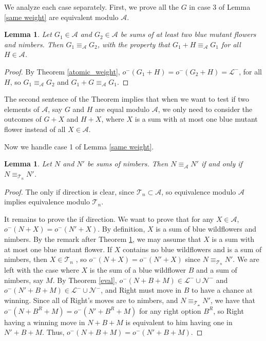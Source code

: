 \documentclass{amsart}
\theoremstyle{plain}
\newtheorem{lemma}[thm]{Lemma}
\theoremstyle{definition}
\theoremstyle{remark}
\numberwithin{equation}{section}
\numberwithin{thm}{section}
\begin{document}
 We analyze each case separately. First, we prove all the $G$ in case 3 of Lemma \ref{same weight}  are equivalent modulo $\mathscr{A}$.
\begin{lemma}
    \label{two_blue}
    Let $G_1\in \mathscr{A}$ and $G_2 \in \mathscr{A}$ be sums of at least two blue mutant flowers and nimbers. Then $G_1 \equiv_{\mathscr{A}} G_2$, with the property that $G_1 + H \equiv_{\mathscr{A}}  G_1$ for all $H \in \mathscr{A}$.
\end{lemma}
\begin{proof}
    By Theorem \ref{atomic_weight}, $o^-(G_1+H) = o^-(G_2+H) = \mathcal{L}^-$, for all $H$, so $G_1 \equiv_{\mathscr{A}} G_2$ and $G_1 + G \equiv_{\mathscr{A}} G_1$.
\end{proof}
The second sentence of the Theorem implies that when we want to test if two elements of $\mathscr{A}$, say $G$ and $H$ are equal modulo $\mathscr{A}$, we only need to consider the outcomes of $G+X$ and $H+X$, where $X$ is a sum with at most one blue mutant flower instead of all $X \in \mathscr{A}$.

Now we handle case 1 of Lemma \ref{same weight}.
\begin{lemma}
\label{1}
    Let $N$ and $N'$ be sums of nimbers. Then $N \equiv_{\mathscr{A}} N'$ if and only if  $N \equiv_{\mathscr{T}_n} N'$.
\end{lemma}
\begin{proof}
    The only if direction is clear, since $\mathscr{T}_n \subset \mathscr{A}$, so equivalence modulo $\mathscr{A}$ implies equivalence modulo $\mathscr{T}_n$.
    
  It remains to prove the if direction. We want to prove that for any $X \in \mathscr{A}$, $o^-(N+X) = o^-(N'+X)$. By definition, $X$ is a sum of blue wildflowers and nimbers. By the remark after Theorem \ref{two_blue}, we may assume that $X$ is a sum with at most one blue mutant flower. If $X$ contains no blue wildflowers and is a sum of nimbers, then $X \in \mathscr{T}_n$ , so $o^-(N+X)=o^-(N'+X)$ since $N \equiv_{\mathscr{T}_n} N'$. We are left with the case where $X$ is the sum of a blue wildflower $B$ and a sum of nimbers, say $M$. By Theorem \ref{eval}, $o^-(N+B+M) \in \mathcal{L}^- \cup \mathcal{N}^-$ and $o^-(N' + B+M) \in \mathcal{L}^- \cup \mathcal{N}^-$, and Right must move in $B$ to have a chance at winning. Since all of Right's moves are to nimbers, and $N \equiv_{\mathscr{T_n}} N'$, we have that $o^- (N+B^R + M) = o^- (N' + B^R +M)$ for any right option $B^R$, so Right having a winning move in $N+B+M$ is equivalent to him having one in $N'+B+M$. Thus, $o^-(N+B+M) = o^-(N'+B+M)$.
\end{proof}
\end{document}

